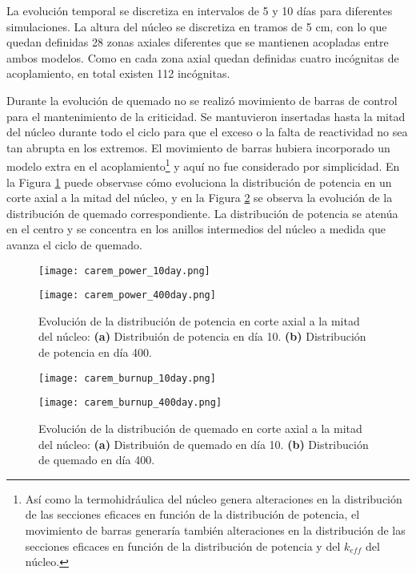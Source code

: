 La evolución temporal se discretiza en intervalos de 5 y 10 días para diferentes simulaciones.
La altura del núcleo se discretiza en tramos de 5 cm, con lo que quedan definidas 28 zonas axiales diferentes que se mantienen acopladas entre ambos modelos.
Como en cada zona axial quedan definidas cuatro incógnitas de acoplamiento, en total existen 112 incógnitas.

Durante la evolución de quemado no se realizó movimiento de barras de control para el mantenimiento de la criticidad.
Se mantuvieron insertadas hasta la mitad del núcleo durante todo el ciclo para que el exceso o la falta de reactividad no sea tan abrupta en los extremos.
El movimiento de barras hubiera incorporado un modelo extra en el acoplamiento\footnote{
Así como la termohidráulica del núcleo genera alteraciones en la distribución de las secciones eficaces en función de la distribución de potencia,
el movimiento de barras generaría también alteraciones en la distribución de las secciones eficaces en función de la distribución de potencia y del $k_{eff}$ del núcleo.
} y aquí no fue considerado por simplicidad.
En la Figura \ref{carem_power} puede observase cómo evoluciona la distribución de potencia en un corte axial a la mitad del núcleo,
y en la Figura \ref{carem_burnup} se observa la evolución de la distribución de quemado correspondiente.
La distribución de potencia se atenúa en el centro y se concentra en los anillos intermedios del núcleo a medida que avanza el ciclo de quemado.

\begin{figure}[ht]
	\begin{minipage}{0.5\linewidth}
		\centering
		\texttt{[image: carem\_power\_10day.png]}
	\end{minipage}
	\begin{minipage}{0.5\linewidth}
		\centering
		\texttt{[image: carem\_power\_400day.png]}
	\end{minipage}
\caption[Modelo de núcleo del reactor CAREM-25]
{Evolución de la distribución de potencia en corte axial a la mitad del núcleo:
\textbf{(a)} Distribuión de potencia en día 10.
\textbf{(b)} Distribución de potencia en día 400.
}
\label{carem_power}
\end{figure}

\begin{figure}[ht]
	\begin{minipage}{0.5\linewidth}
		\centering
		\texttt{[image: carem\_burnup\_10day.png]}
	\end{minipage}
	\begin{minipage}{0.5\linewidth}
		\centering
		\texttt{[image: carem\_burnup\_400day.png]}
	\end{minipage}
\caption[Modelo de núcleo del reactor CAREM-25]
{Evolución de la distribución de quemado en corte axial a la mitad del núcleo:
\textbf{(a)} Distribuión de quemado en día 10.
\textbf{(b)} Distribución de quemado en día 400.
}
\label{carem_burnup}
\end{figure}

